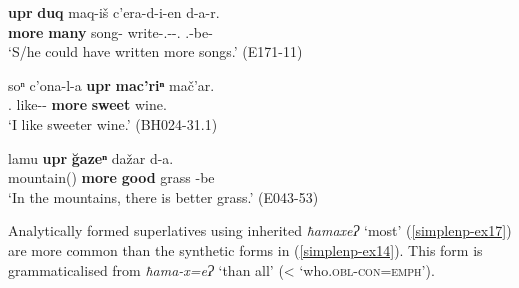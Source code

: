 \begin{exe}
	\ex\label{simplenp-ex16}
	\begin{xlist}
		
		\ex\label{simplenp-ex16a}
		\gll \textbf{upr} \textbf{duq} maq-iš c'era-d-i-en d-a-r. \\
		\textbf{more} \textbf{many} song-{\Pl} write-{\B}.{\Pl}-{\Tr}-{\Ptcp}.{\Aor} {\B}.{\Pl}-be-{{\Imprf}} \\
		\trans `S/he could have written more songs.'
		\hfill (E171-11)
		
		\ex\label{simplenp-ex16b}
		\gll soⁿ c'ona-l-a \textbf{upr} \textbf{mac'riⁿ} mač'ar. \\
		{\Fsg}.{\Dat} like-{\Intr}-{\Npst} \textbf{more} \textbf{sweet} wine. \\
		\trans `I like sweeter wine.'
		\hfill (BH024-31.1)
		
		
		\ex\label{simplenp-ex16c}
		\gll lamu \textbf{upr} \textbf{\u{g}azeⁿ} dažar d-a. \\
		mountain({\Ess}) \textbf{more} \textbf{good} grass {\D}-be \\
		\trans `In the mountains, there is better grass.'
		\hfill (E043-53)
		
	\end{xlist}
\end{exe}

Analytically formed superlatives using inherited \textit{ħamaxeɁ} `most' (\ref{simplenp-ex17}) are more common than the synthetic forms in (\ref{simplenp-ex14}). This form is grammaticalised from \textit{ħama-x=eɁ} `than all' (< `who\textsc{.obl-con=emph}'). 

